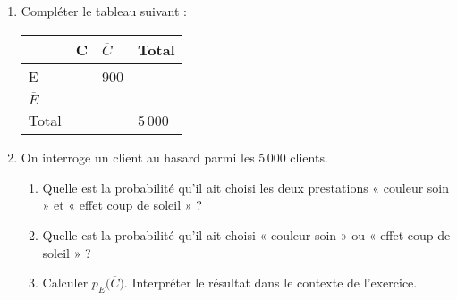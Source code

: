 \documentclass[a4paper,11pt]{article}
\begin{document}
\begin{enumerate}
	\item Compléter le tableau suivant : 
	\begin{center}
		\renewcommand{\arraystretch}{1.25}
		\setlength{\arrayrulewidth}{0.8pt}
		\begin{tabularx}{12cm}{|Y|Y|Y|Y|}
			 & C & $\overline{C}$ & Total \\ \hline
			E & & 900 & \\ \hline
			$\overline{E}$ & & & \\ \hline
			Total & & & 5\,000 \\ \hline
		\end{tabularx}
	\end{center}
	\item On interroge un client au hasard parmi les 5\,000 clients.
	\begin{enumerate}
		\item Quelle est la probabilité qu’il ait choisi les deux prestations « couleur soin » et « effet coup de soleil » ? 
		\item Quelle est la probabilité qu’il ait choisi « couleur soin » ou « effet coup de soleil » ? 
		\item Calculer $p_E \big(\overline{C}\big)$. Interpréter le résultat dans le contexte de l'exercice.
	\end{enumerate} 
\end{enumerate}

\bigskip


\medskip
\end{document}
